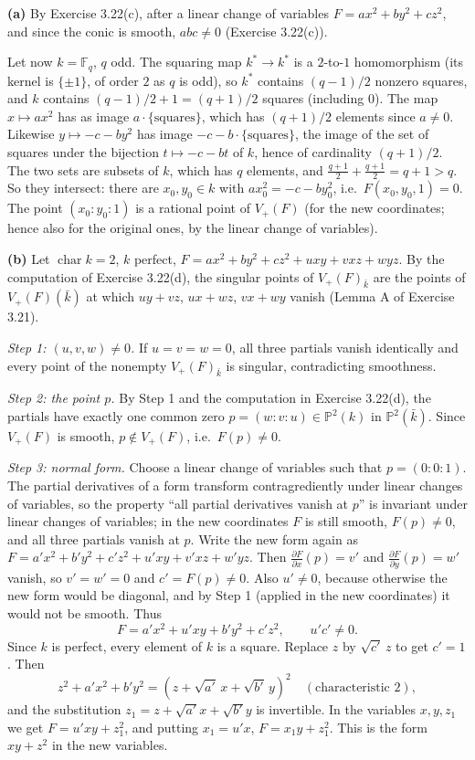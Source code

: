 \documentclass[11pt]{article}
\begin{document}
\textbf{(a)} By Exercise 3.22(c), after a linear change of variables $F=ax^2+by^2+cz^2$, and since the conic is smooth, $abc\neq0$ (Exercise 3.22(c)).

Let now $k=\mathbb F_q$, $q$ odd. The squaring map $k^*\to k^*$ is a $2$-to-$1$ homomorphism (its kernel is $\{\pm1\}$, of order $2$ as $q$ is odd), so $k^*$ contains $(q-1)/2$ nonzero squares, and $k$ contains $(q-1)/2+1=(q+1)/2$ squares (including $0$). The map $x\mapsto ax^2$ has as image $a\cdot\{\text{squares}\}$, which has $(q+1)/2$ elements since $a\neq0$. Likewise $y\mapsto-c-by^2$ has image $-c-b\cdot\{\text{squares}\}$, the image of the set of squares under the bijection $t\mapsto-c-bt$ of $k$, hence of cardinality $(q+1)/2$. The two sets are subsets of $k$, which has $q$ elements, and $\frac{q+1}2+\frac{q+1}2=q+1>q$. So they intersect: there are $x_0,y_0\in k$ with $ax_0^2=-c-by_0^2$, i.e.\ $F(x_0,y_0,1)=0$. The point $(x_0:y_0:1)$ is a rational point of $V_+(F)$ (for the new coordinates; hence also for the original ones, by the linear change of variables).

\textbf{(b)} Let $\operatorname{char}k=2$, $k$ perfect, $F=ax^2+by^2+cz^2+uxy+vxz+wyz$. By the computation of Exercise 3.22(d), the singular points of $V_+(F)_{\bar k}$ are the points of $V_+(F)(\bar k)$ at which $uy+vz$, $ux+wz$, $vx+wy$ vanish (Lemma A of Exercise 3.21).

\emph{Step 1: $(u,v,w)\neq0$.} If $u=v=w=0$, all three partials vanish identically and every point of the nonempty $V_+(F)_{\bar k}$ is singular, contradicting smoothness.

\emph{Step 2: the point $p$.} By Step 1 and the computation in Exercise 3.22(d), the partials have exactly one common zero $p=(w:v:u)\in\mathbb P^2(k)$ in $\mathbb P^2(\bar k)$. Since $V_+(F)$ is smooth, $p\notin V_+(F)$, i.e.\ $F(p)\neq0$.

\emph{Step 3: normal form.} Choose a linear change of variables such that $p=(0:0:1)$. The partial derivatives of a form transform contragrediently under linear changes of variables, so the property ``all partial derivatives vanish at $p$'' is invariant under linear changes of variables; in the new coordinates $F$ is still smooth, $F(p)\neq0$, and all three partials vanish at $p$. Write the new form again as $F=a'x^2+b'y^2+c'z^2+u'xy+v'xz+w'yz$. Then $\frac{\partial F}{\partial x}(p)=v'$ and $\frac{\partial F}{\partial y}(p)=w'$ vanish, so $v'=w'=0$ and $c'=F(p)\neq0$. Also $u'\neq0$, because otherwise the new form would be diagonal, and by Step 1 (applied in the new coordinates) it would not be smooth. Thus
\[ F=a'x^2+u'xy+b'y^2+c'z^2,\qquad u'c'\neq0. \]
Since $k$ is perfect, every element of $k$ is a square. Replace $z$ by $\sqrt{c'}\,z$ to get $c'=1$. Then
\[ z^2+a'x^2+b'y^2=(z+\sqrt{a'}\,x+\sqrt{b'}\,y)^2\quad(\text{characteristic }2), \]
and the substitution $z_1=z+\sqrt{a'}x+\sqrt{b'}y$ is invertible. In the variables $x,y,z_1$ we get $F=u'xy+z_1^2$, and putting $x_1=u'x$, $F=x_1y+z_1^2$. This is the form $xy+z^2$ in the new variables.
\end{document}
